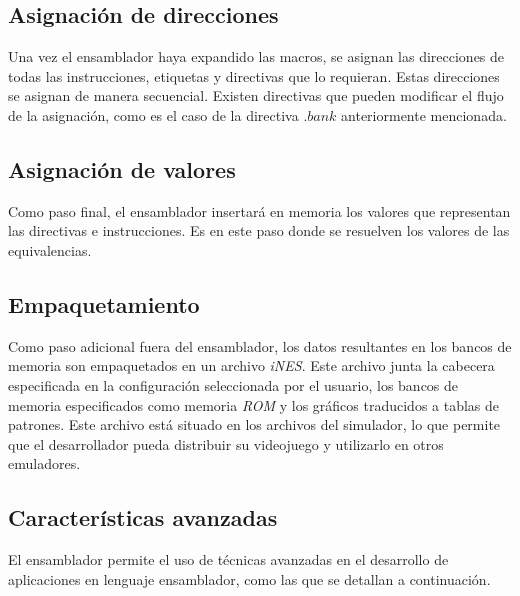 \subsection{Asignación de direcciones}\label{subsec:asignacion-de-direcciones}

Una vez el ensamblador haya expandido las macros,
se asignan las direcciones de todas las instrucciones,
etiquetas y directivas que lo requieran.
Estas direcciones se asignan de manera secuencial.
Existen directivas que pueden modificar el flujo de la asignación,
como es el caso de la directiva $.bank$ anteriormente mencionada.

\subsection{Asignación de valores}\label{subsec:asignacion-de-valores}

Como paso final, el ensamblador insertará en memoria los valores
que representan las directivas e instrucciones.
Es en este paso donde se resuelven los valores de las equivalencias.

\subsection{Empaquetamiento}\label{subsec:empaquetamiento}

Como paso adicional fuera del ensamblador, los datos resultantes
en los bancos de memoria son empaquetados en un archivo \textit{iNES}.
Este archivo junta la cabecera especificada en la configuración seleccionada
por el usuario, los bancos de memoria especificados como memoria
\textit{ROM} y los gráficos traducidos a tablas de patrones.
Este archivo está situado en los archivos del simulador, lo que
permite que el desarrollador pueda distribuir su videojuego
y utilizarlo en otros emuladores.

\subsection{Características avanzadas}\label{subsec:características-avanzadas}

El ensamblador permite el uso de técnicas avanzadas en
el desarrollo de aplicaciones en lenguaje ensamblador, como
las que se detallan a continuación.


